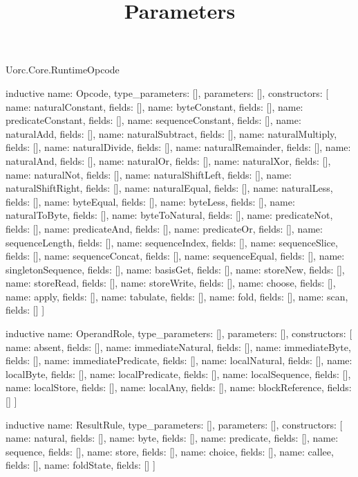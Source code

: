 \begin{lexlean}{Uorc.Core.RuntimeOpcode}
\title{Parameters}
\begin{semanticmodule}
inductive{
  name: Opcode,
  type_parameters: [],
  parameters: [],
  constructors: [
    {name: naturalConstant, fields: []},
    {name: byteConstant, fields: []},
    {name: predicateConstant, fields: []},
    {name: sequenceConstant, fields: []},
    {name: naturalAdd, fields: []},
    {name: naturalSubtract, fields: []},
    {name: naturalMultiply, fields: []},
    {name: naturalDivide, fields: []},
    {name: naturalRemainder, fields: []},
    {name: naturalAnd, fields: []},
    {name: naturalOr, fields: []},
    {name: naturalXor, fields: []},
    {name: naturalNot, fields: []},
    {name: naturalShiftLeft, fields: []},
    {name: naturalShiftRight, fields: []},
    {name: naturalEqual, fields: []},
    {name: naturalLess, fields: []},
    {name: byteEqual, fields: []},
    {name: byteLess, fields: []},
    {name: naturalToByte, fields: []},
    {name: byteToNatural, fields: []},
    {name: predicateNot, fields: []},
    {name: predicateAnd, fields: []},
    {name: predicateOr, fields: []},
    {name: sequenceLength, fields: []},
    {name: sequenceIndex, fields: []},
    {name: sequenceSlice, fields: []},
    {name: sequenceConcat, fields: []},
    {name: sequenceEqual, fields: []},
    {name: singletonSequence, fields: []},
    {name: basisGet, fields: []},
    {name: storeNew, fields: []},
    {name: storeRead, fields: []},
    {name: storeWrite, fields: []},
    {name: choose, fields: []},
    {name: apply, fields: []},
    {name: tabulate, fields: []},
    {name: fold, fields: []},
    {name: scan, fields: []}
  ]
}

inductive{
  name: OperandRole,
  type_parameters: [],
  parameters: [],
  constructors: [
    {name: absent, fields: []},
    {name: immediateNatural, fields: []},
    {name: immediateByte, fields: []},
    {name: immediatePredicate, fields: []},
    {name: localNatural, fields: []},
    {name: localByte, fields: []},
    {name: localPredicate, fields: []},
    {name: localSequence, fields: []},
    {name: localStore, fields: []},
    {name: localAny, fields: []},
    {name: blockReference, fields: []}
  ]
}

inductive{
  name: ResultRule,
  type_parameters: [],
  parameters: [],
  constructors: [
    {name: natural, fields: []},
    {name: byte, fields: []},
    {name: predicate, fields: []},
    {name: sequence, fields: []},
    {name: store, fields: []},
    {name: choice, fields: []},
    {name: callee, fields: []},
    {name: foldState, fields: []}
  ]
}


\end{semanticmodule}
\end{lexlean}
